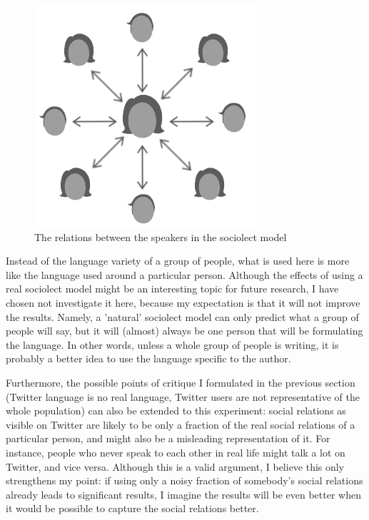 \documentclass[11pt]{article}
\begin{document}
\begin{figure}[H] \centering
\includegraphics[scale=0.75]{sloppy_network}
\caption{The relations between the speakers in the sociolect model}
\end{figure} 

Instead of the language variety of a group of people, what is used here is more like the language used around a particular person. Although the effects of using a real sociolect model might be an interesting topic for future research, I have chosen not investigate it here, because my expectation is that it will not improve the results. Namely, a 'natural' sociolect model can only predict what a group of people will say, but it will (almost) always be one person that will be formulating the language. In other words, unless a whole group of people is writing, it is probably a better idea to use the language specific to the author.


Furthermore, the possible points of critique I formulated in the previous section (Twitter language is no real language, Twitter users are not representative of the whole population) can also be extended to this experiment: social relations as visible on Twitter are likely to be only a fraction of the real social relations of a particular person, and might also be a misleading representation of it. For instance, people who never speak to each other in real life might talk a lot on Twitter, and vice versa. Although this is a valid argument, I believe this only strengthens my point: if using only a noisy fraction of somebody's social relations already leads to significant results, I imagine the results will be even better when it would be possible to capture the social relations better.
\end{document}

